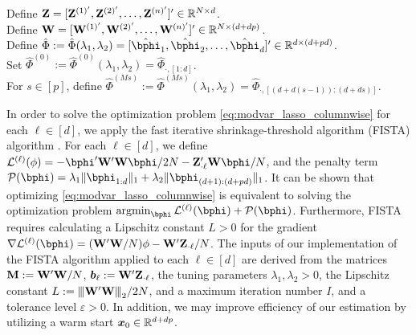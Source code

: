 \begin{singlespace}
	\begin{algorithm}
		\SetAlgoLined
		Define $\mathbf{Z} = [\mathbf{Z}^{(1)'}, \mathbf{Z}^{(2)'}, \ldots, \mathbf{Z}^{(n)'}]'\in\mathbb{R}^{N\times d}$.\\
		Define $\mathbf{W} = [\mathbf{W}^{(1)'}, \mathbf{W}^{(2)'}, \ldots, \mathbf{W}^{(n)'}]'\in\mathbb{R}^{N\times (d+dp)}$.\\
		Define $\hat\Phi:=\hat\Phi(\lambda_1,\lambda_2) = [\hat\bphi_1,\hat\bphi_2,\ldots, \hat\bphi_d]'\in\bbR^{d\times (d+pd)}$. \\
		Set $\hat\Phi^{(0)} := \hat\Phi^{(0)}(\lambda_1,\lambda_2) = \hat\Phi_{\cdot, [1:d]} $.\\
		For $s \in[p]$, define $\hat\Phi^{(M s)} := \hat\Phi^{(M s)}(\lambda_1,\lambda_2) = \hat\Phi_{\cdot, [(d+ d(s-1)):(d+ds)]} $.\\
		\caption{MOD-VAR.}\label{alg:MODVAR}
	\end{algorithm}
\end{singlespace}%

In order to solve the optimization problem \eqref{eq:modvar_lasso_columnwise} for each $\ell\in[d]$, we apply the fast iterative shrinkage-threshold algorithm (FISTA) algorithm  \citep{beck2009fast}. For each $\ell\in[d]$, we define $\cL^{(\ell)}(\phi) =   - \bphi'\Wb'\Wb \bphi / 2N - \Zb_{\cdot \ell}'\Wb \bphi / N$, and the penalty term  $\cP(\bphi) = \lambda_1\|\bphi_{1:d}\|_1 + \lambda_2\|\bphi_{(d+1):(d+pd)}\|_1 $. It can be shown that optimizing \eqref{eq:modvar_lasso_columnwise} is equivalent to solving the optimization problem $\argmin_{\bphi}\cL^{(\ell)}(\bphi) + \cP(\bphi)$.  Furthermore, FISTA requires calculating a Lipschitz constant $L>0$  for the gradient $\nabla\cL^{(\ell)}(\bphi) = ({\Wb'\Wb}/N) \phi - \Wb'\Zb_{\cdot \ell}/N$. The inputs of our implementation of the FISTA algorithm applied to each $\ell \in[d]$ are derived from the matrices $\mathbf{M}:= {\mathbf{W}'\mathbf{W}}/N$, $\bm{b}_\ell := \mathbf{W}'\mathbf{Z}_{\cdot \ell}$, the tuning parameters $\lambda_1,\lambda_2 > 0$, the Lipschitz constant $L  := {\left\vert\kern-0.25ex\left\vert\kern-0.25ex\left\vert \mathbf{W}'\mathbf{W} \right\vert\kern-0.25ex\right\vert\kern-0.25ex\right\vert}_2/2N$, and a maximum iteration number $I$, and a tolerance level $\varepsilon > 0$. In addition, we may improve efficiency of our estimation by utilizing a warm start $\bm{x}_0\in\mathbb{R}^{d+dp}$. 

